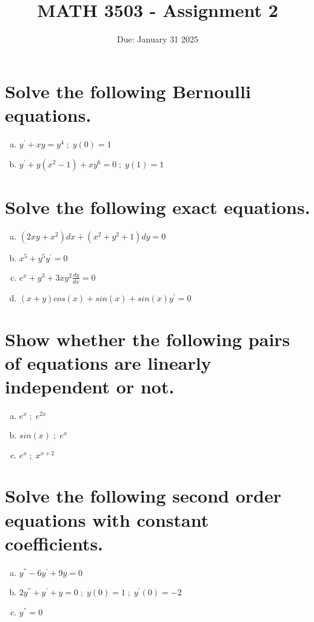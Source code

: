 \documentclass{article}
\title{MATH 3503 - Assignment 2}
\date{Due: January 31 2025}
\begin{document}
\maketitle

\section{Solve the following Bernoulli equations.}
\begin{enumerate}[a)]
    \item $y^{'} +xy = y^4 \; ; \; y(0) = 1$
    \item $y^{'} + y(x^2 - 1) + xy^6 = 0 \; ; \; y(1)=1$
\end{enumerate}

\section{Solve the following exact equations.}
\begin{enumerate}[a)]
    \item $(2xy + x^2)dx + (x^2 + y^2 + 1)dy = 0$
    \item $x^5 + y^5 y^{'} = 0$
    \item $e^x + y^3 + 3xy^2 \frac{dy}{dx} = 0$
    \item $(x + y) cos(x) + sin(x) + sin(x) y^{'} = 0$
\end{enumerate}

\section{Show whether the following pairs of equations are linearly independent or not.}
\begin{enumerate}[a)]
    \item $e^x \; ; \; e^{2x}$
    \item $sin(x) \; ; \; e^x$
    \item $e^x \; ; \; x^{x+2}$
\end{enumerate}

\section{Solve the following second order equations with constant coefficients.}
\begin{enumerate}[a)]
    \item $y^{''} - 6 y^{'} + 9 y = 0$
    \item $2 y^{''} + y^{'} + y = 0 \; ; \; y(0) = 1 \; ; \; y^{'}(0) = -2$
    \item $y^{''} = 0$
\end{enumerate}
\end{document}
